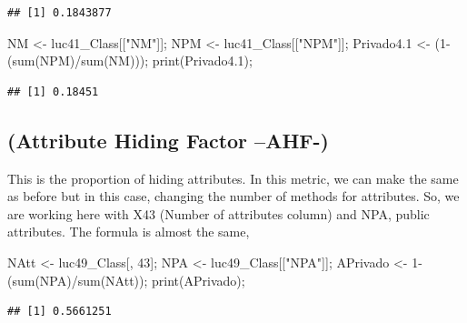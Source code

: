\documentclass[
]{article}
\newenvironment{Shaded}{\begin{snugshade}}{\end{snugshade}}
\newcommand{\DecValTok}[1]{\textcolor[rgb]{0.00,0.00,0.81}{#1}}
\newcommand{\FloatTok}[1]{\textcolor[rgb]{0.00,0.00,0.81}{#1}}
\newcommand{\FunctionTok}[1]{\textcolor[rgb]{0.00,0.00,0.00}{#1}}
\newcommand{\NormalTok}[1]{#1}
\newcommand{\OtherTok}[1]{\textcolor[rgb]{0.56,0.35,0.01}{#1}}
\newcommand{\SpecialCharTok}[1]{\textcolor[rgb]{0.00,0.00,0.00}{#1}}
\newcommand{\StringTok}[1]{\textcolor[rgb]{0.31,0.60,0.02}{#1}}
\begin{document}
\begin{verbatim}
## [1] 0.1843877
\end{verbatim}

\begin{Shaded}
\begin{Highlighting}[]
\NormalTok{NM }\OtherTok{\textless{}{-}}\NormalTok{ luc41\_Class[[}\StringTok{"NM"}\NormalTok{]];}
\NormalTok{NPM }\OtherTok{\textless{}{-}}\NormalTok{ luc41\_Class[[}\StringTok{"NPM"}\NormalTok{]];}
\NormalTok{Privado4}\FloatTok{.1} \OtherTok{\textless{}{-}}\NormalTok{ (}\DecValTok{1}\SpecialCharTok{{-}}\NormalTok{(}\FunctionTok{sum}\NormalTok{(NPM)}\SpecialCharTok{/}\FunctionTok{sum}\NormalTok{(NM)));}
\FunctionTok{print}\NormalTok{(Privado4}\FloatTok{.1}\NormalTok{);}
\end{Highlighting}
\end{Shaded}

\begin{verbatim}
## [1] 0.18451
\end{verbatim}

\hypertarget{attribute-hiding-factor-ahf-}{%
\subsection{(Attribute Hiding Factor
--AHF-)}\label{attribute-hiding-factor-ahf-}}

This is the proportion of hiding attributes. In this metric, we can make
the same as before but in this case, changing the number of methods for
attributes. So, we are working here with X43 (Number of attributes
column) and NPA, public attributes. The formula is almost the same,

\begin{Shaded}
\begin{Highlighting}[]
\NormalTok{NAtt }\OtherTok{\textless{}{-}}\NormalTok{ luc49\_Class[, }\DecValTok{43}\NormalTok{];}
\NormalTok{NPA }\OtherTok{\textless{}{-}}\NormalTok{ luc49\_Class[[}\StringTok{"NPA"}\NormalTok{]];}
\NormalTok{APrivado }\OtherTok{\textless{}{-}} \DecValTok{1}\SpecialCharTok{{-}}\NormalTok{(}\FunctionTok{sum}\NormalTok{(NPA)}\SpecialCharTok{/}\FunctionTok{sum}\NormalTok{(NAtt));}
\FunctionTok{print}\NormalTok{(APrivado);}
\end{Highlighting}
\end{Shaded}

\begin{verbatim}
## [1] 0.5661251
\end{verbatim}
\end{document}
